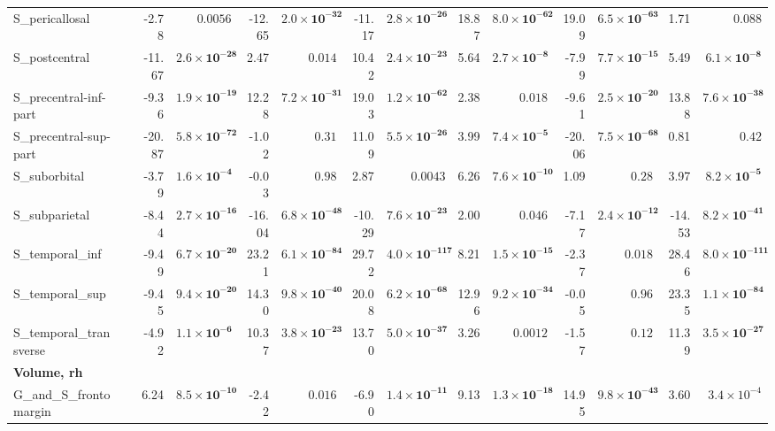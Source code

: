 {\begin{longtable}{llrrrrrrrrrrrr}
S\_pericallosal &  & -2.78 & $0.0056$ & -12.65 & $\mathbf{2.0{\times}10^{-32}}$ & -11.17 & $\mathbf{2.8{\times}10^{-26}}$ & 18.87 & $\mathbf{8.0{\times}10^{-62}}$ & 19.09 & $\mathbf{6.5{\times}10^{-63}}$ & 1.71 & $0.088$ \\
S\_postcentral &  & -11.67 & $\mathbf{2.6{\times}10^{-28}}$ & 2.47 & $0.014$ & 10.42 & $\mathbf{2.4{\times}10^{-23}}$ & 5.64 & $\mathbf{2.7{\times}10^{-8}}$ & -7.99 & $\mathbf{7.7{\times}10^{-15}}$ & 5.49 & $\mathbf{6.1{\times}10^{-8}}$ \\
S\_precentral-inf-part &  & -9.36 & $\mathbf{1.9{\times}10^{-19}}$ & 12.28 & $\mathbf{7.2{\times}10^{-31}}$ & 19.03 & $\mathbf{1.2{\times}10^{-62}}$ & 2.38 & $0.018$ & -9.61 & $\mathbf{2.5{\times}10^{-20}}$ & 13.88 & $\mathbf{7.6{\times}10^{-38}}$ \\
S\_precentral-sup-part &  & -20.87 & $\mathbf{5.8{\times}10^{-72}}$ & -1.02 & $0.31$ & 11.09 & $\mathbf{5.5{\times}10^{-26}}$ & 3.99 & $\mathbf{7.4{\times}10^{-5}}$ & -20.06 & $\mathbf{7.5{\times}10^{-68}}$ & 0.81 & $0.42$ \\
S\_suborbital &  & -3.79 & $\mathbf{1.6{\times}10^{-4}}$ & -0.03 & $0.98$ & 2.87 & $0.0043$ & 6.26 & $\mathbf{7.6{\times}10^{-10}}$ & 1.09 & $0.28$ & 3.97 & $\mathbf{8.2{\times}10^{-5}}$ \\
S\_subparietal &  & -8.44 & $\mathbf{2.7{\times}10^{-16}}$ & -16.04 & $\mathbf{6.8{\times}10^{-48}}$ & -10.29 & $\mathbf{7.6{\times}10^{-23}}$ & 2.00 & $0.046$ & -7.17 & $\mathbf{2.4{\times}10^{-12}}$ & -14.53 & $\mathbf{8.2{\times}10^{-41}}$ \\
S\_temporal\_inf &  & -9.49 & $\mathbf{6.7{\times}10^{-20}}$ & 23.21 & $\mathbf{6.1{\times}10^{-84}}$ & 29.72 & $\mathbf{4.0{\times}10^{-117}}$ & 8.21 & $\mathbf{1.5{\times}10^{-15}}$ & -2.37 & $0.018$ & 28.46 & $\mathbf{8.0{\times}10^{-111}}$ \\
S\_temporal\_sup &  & -9.45 & $\mathbf{9.4{\times}10^{-20}}$ & 14.30 & $\mathbf{9.8{\times}10^{-40}}$ & 20.08 & $\mathbf{6.2{\times}10^{-68}}$ & 12.96 & $\mathbf{9.2{\times}10^{-34}}$ & -0.05 & $0.96$ & 23.35 & $\mathbf{1.1{\times}10^{-84}}$ \\
S\_temporal\_transverse &  & -4.92 & $\mathbf{1.1{\times}10^{-6}}$ & 10.37 & $\mathbf{3.8{\times}10^{-23}}$ & 13.70 & $\mathbf{5.0{\times}10^{-37}}$ & 3.26 & $0.0012$ & -1.57 & $0.12$ & 11.39 & $\mathbf{3.5{\times}10^{-27}}$ \\
\midrule\multicolumn{14}{l}{\textbf{Volume, rh}} \\
G\_and\_S\_frontomargin &  & 6.24 & $\mathbf{8.5{\times}10^{-10}}$ & -2.42 & $0.016$ & -6.90 & $\mathbf{1.4{\times}10^{-11}}$ & 9.13 & $\mathbf{1.3{\times}10^{-18}}$ & 14.95 & $\mathbf{9.8{\times}10^{-43}}$ & 3.60 & $3.4{\times}10^{-4}$ \\

\end{longtable}}
